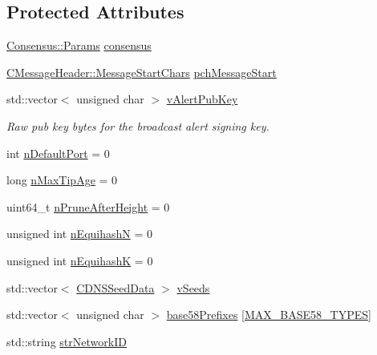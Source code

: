 \subsection*{Protected Attributes}
\begin{DoxyCompactItemize}
\item 
\mbox{\hyperlink{chainparams_8h_a5e1ca1b35c3dd1a4e20f18445f28dd9c}{Consensus\+::\+Params}} \mbox{\hyperlink{class_c_chain_params_a9eddbbd84a87109643d670766683aae2}{consensus}}
\item 
\mbox{\hyperlink{class_c_message_header_a0d0eeb540cbf4087973f6652ad61878f}{C\+Message\+Header\+::\+Message\+Start\+Chars}} \mbox{\hyperlink{class_c_chain_params_ae403e6b6d36b8f8c4d9d494cf686658c}{pch\+Message\+Start}}
\item 
std\+::vector$<$ unsigned char $>$ \mbox{\hyperlink{class_c_chain_params_adf435bdf2d9cd00936d7da0fb4237921}{v\+Alert\+Pub\+Key}}
\begin{DoxyCompactList}\small\item\em Raw pub key bytes for the broadcast alert signing key. \end{DoxyCompactList}\item 
int \mbox{\hyperlink{class_c_chain_params_a76d9a8dc59e179ca94b6b9e04a93e5f4}{n\+Default\+Port}} = 0
\item 
long \mbox{\hyperlink{class_c_chain_params_af0503b711c4544b49bd8051e31307264}{n\+Max\+Tip\+Age}} = 0
\item 
uint64\+\_\+t \mbox{\hyperlink{class_c_chain_params_aee6b9132f0ce8dcbfc242c3d2e1293e6}{n\+Prune\+After\+Height}} = 0
\item 
unsigned int \mbox{\hyperlink{class_c_chain_params_a6bed7d29dc273f097a9574286041803a}{n\+EquihashN}} = 0
\item 
unsigned int \mbox{\hyperlink{class_c_chain_params_a07ec113c3eb578647253a8ac3b2e33f8}{n\+EquihashK}} = 0
\item 
std\+::vector$<$ \mbox{\hyperlink{struct_c_d_n_s_seed_data}{C\+D\+N\+S\+Seed\+Data}} $>$ \mbox{\hyperlink{class_c_chain_params_a9ce50b4162fb2ebf5bd72ad4045aa70c}{v\+Seeds}}
\item 
std\+::vector$<$ unsigned char $>$ \mbox{\hyperlink{class_c_chain_params_a923d956c5d3891d0c682b7ef5410ed8f}{base58\+Prefixes}} \mbox{[}\mbox{\hyperlink{class_c_chain_params_aa294058ec2e3586bd8d03d6c39667058a6b21a525c7fab64a5df656e708f71a98}{M\+A\+X\+\_\+\+B\+A\+S\+E58\+\_\+\+T\+Y\+P\+ES}}\mbox{]}
\item 
std\+::string \mbox{\hyperlink{class_c_chain_params_a8542ce21d5b9bdc2eadad8702fdd584a}{str\+Network\+ID}}

\end{DoxyCompactItemize}
